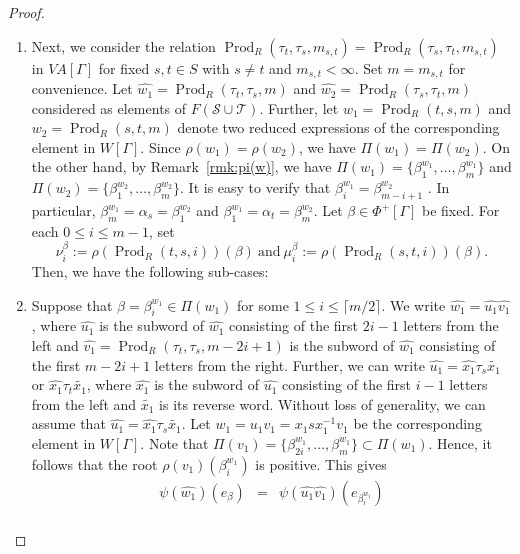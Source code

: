 \documentclass[12pt]{amsart}
\numberwithin{equation}{section}
\begin{document}
\begin{proof}
\begin{enumerate}
\item Next, we consider the relation $\operatorname{Prod}_R\left(\tau_t, \tau_s, m_{s, t}\right)=\operatorname{Prod}_R\left(\tau_s, \tau_t, m_{s, t}\right)$ in $VA[\Gamma]$ for  fixed $s, t \in S$ with $s \neq t$ and $m_{s, t} < \infty$.  Set $m=m_{s, t}$ for convenience. Let $\widehat{w_1}=\operatorname{Prod}_R\left(\tau_t, \tau_s, m \right)$ and $\widehat{w_2}= \operatorname{Prod}_R\left(\tau_s, \tau_t, m\right)$ considered as elements of $F(\mathcal{S} \cup \mathcal{T})$. Further, let $w_1=\operatorname{Prod}_R\left(t,s, m\right)$ and $w_2=\operatorname{Prod}_R\left(s, t, m\right)$ denote  two reduced expressions of the corresponding element in $W[\Gamma]$. Since $\rho(w_1)=\rho(w_2)$, we have $\Pi(w_1)= \Pi(w_2)$. On the other hand,  by Remark~\ref{rmk:pi(w)}, we have $\Pi(w_1)=\{\beta^{w_1}_1, \ldots, \beta^{w_1}_m\}$ and $\Pi(w_2)=\{\beta^{w_2}_1, \ldots, \beta^{w_2}_m\}$. It is easy to verify that $\beta^{w_1}_i=\beta^{w_2}_{m-i+1}$ \cite[Proof of Lemma 2.5]{MR4753773}. In particular, $\beta^{w_1}_m=\alpha_s=\beta^{w_2}_1$ and $\beta^{w_1}_1=\alpha_t=\beta^{w_2}_m$. Let $\beta\in \Phi^{+}[\Gamma]$ be fixed.  For each $0\leq i \leq m-1$, set 
$$\nu^{\beta}_i :=\rho(\operatorname{Prod}_R\left(t,s, i\right))(\beta)~\textrm{and}~ \mu^{\beta}_i:=\rho(\operatorname{Prod}_R\left(s,t, i\right))(\beta).$$ 
Then, we have the following sub-cases:
  \item[Case (3a)] Suppose that $\beta=\beta^{w_1}_i\in \Pi(w_1)$ for some $1 \le i\leq \lceil m/2\rceil $. We write $\widehat{w_1}= \widehat{u_1}  \widehat{v_1}$, where  $\widehat{u_1}$ is the subword of $\widehat{w_1}$ consisting of the first $2i-1$ letters from the left and $\widehat{v_1}=\operatorname{Prod}_R\left(\tau_t, \tau_s, m-2i+1\right)$ is the subword of $\widehat{w_1}$ consisting of the first $m-2i+1$ letters from the right. Further, we can write $\widehat{u_1}=\widehat{x_1}\tau_s \widetilde{x_1} $ or $\widehat{x_1}\tau_t \widetilde{x_1}$,  where $\widehat{x_1}$ is the subword of $\widehat{u_1}$ consisting of the first $i-1$ letters from the left and $\widetilde{x_1}$ is its reverse word. Without loss of generality, we can assume that $\widehat{u_1}=\widehat{x_1}\tau_s \widetilde{x_1}$. Let $w_1=u_1v_1=x_1 s x_1^{-1}v_1$ be the corresponding element in $W[\Gamma]$. Note that $\Pi(v_1)= \{ \beta^{w_1}_{2i}, \ldots, \beta^{w_1}_m\} \subset \Pi(w_1)$.
Hence, it follows that the root $\rho(v_1)(\beta^{w_1}_i)$ is positive. This gives
  \begin{eqnarray*}
   \psi(\widehat{w_1})(e_{\beta}) &=&    \psi(\widehat{u_1} \widehat{v_1})(e_{\beta^{w_1}_i})\\

\end{eqnarray*}
\end{enumerate}
\end{proof}
\end{document}
